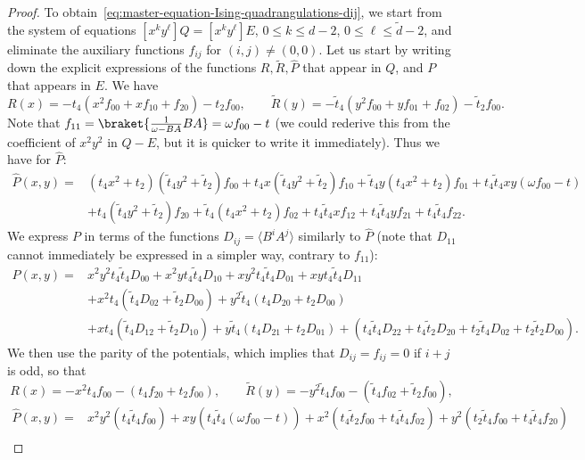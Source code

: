 \documentclass{scrartcl}
\newcommand\brak[1]{\big \langle #1 \big\rangle}
\newcommand\wt[1]{\widetilde{#1}}
\newcommand\wh[1]{\widehat{#1}}
\begin{document}
\begin{proof}
To obtain~\eqref{eq:master-equation-Ising-quadrangulations-dij}, we start from the system of equations $[x^ky^\ell]Q=[x^ky^\ell]E$, $0 \leq k \leq d-2$, $0 \leq \ell \leq \wt d -2$, and eliminate the auxiliary functions $f_{ij}$ for $(i,j)\neq(0,0)$. Let us start by writing down the explicit expressions of the functions $R, \wt{R}, \wh{P}$ that appear in $Q$, and $P$ that appears in $E$. We have
\[
R(x) = -t_4(x^2f_{00} +xf_{10}+f_{20}) - t_2f_{00}, \qquad \widetilde{R}(y) =- \widetilde{t}_4(y^2f_{00} +yf_{01}+f_{02}) - \widetilde{t}_2f_{00}.
\]
Note that $f_{11}=\braket{\frac{1}{\omega - BA}BA}=\omega f_{00}-t$ (we could rederive this from the coefficient of $x^2y^2$ in $Q-E$, but it is quicker to write it immediately). Thus we have for $\wh{P}$:
\begin{align*}
\widehat{P}(x,y) =& (t_4x^2+t_2)(\widetilde{t}_4y^2+\widetilde{t}_2)f_{00} +t_4x(\widetilde{t}_4y^2+\widetilde{t}_2)f_{10} +\widetilde{t}_4y(t_4x^2+t_2)f_{01} +t_4\widetilde{t}_4xy(\omega f_{00} - t) \\
&+t_4(\widetilde{t}_4y^2+\widetilde{t}_2)f_{20} +\widetilde{t}_4(t_4x^2+t_2)f_{02} +t_4\widetilde{t}_4xf_{12} +t_4\widetilde{t}_4yf_{21} +t_4\widetilde{t}_4f_{22}.
\end{align*}
We express $P$ in terms of the functions $D_{ij}=\brak{B^iA^j}$ similarly to $\widehat{P}$ (note that $D_{11}$ cannot immediately be expressed in a simpler way, contrary to $f_{11}$):
\begin{align*}
P(x,y) =& x^2y^2t_4\widetilde{t}_4D_{00} +x^2yt_4\widetilde{t}_4D_{10} +xy^2t_4\widetilde{t}_4D_{01} +xyt_4\widetilde{t}_4D_{11}\\
& +x^2t_4(\widetilde{t}_4D_{02}+\widetilde{t}_2D_{00}) +y^2\widetilde{t}_4(t_4D_{20}+t_2D_{00}) \\
&+xt_4(\widetilde{t}_4D_{12}+\widetilde{t}_2D_{10}) +y\widetilde{t}_4(t_4D_{21}+t_2D_{01}) +(t_4\widetilde{t}_4D_{22}+t_4\widetilde{t}_2D_{20}+t_2\widetilde{t}_4D_{02}+t_2\widetilde{t}_2D_{00}).
\end{align*}
We then use the parity of the potentials, which implies that $D_{ij} = f_{ij} = 0$ if $i+j$ is odd, so that
\[
R(x) = -x^2t_4f_{00} -(t_4f_{20} + t_2f_{00}), \qquad \widetilde{R}(y) =- y^2\widetilde{t}_4f_{00} -(\widetilde{t}_4f_{02} + \widetilde{t}_2f_{00}),
\]
\begin{align*}
\widehat{P}(x,y) =& x^2y^2(t_4\widetilde{t}_4f_{00}) +xy(t_4\widetilde{t}_4(\omega f_{00}-t)) +x^2(t_4\widetilde{t}_2f_{00}+t_4\widetilde{t}_4f_{02}) +y^2(t_2\widetilde{t}_4f_{00}+t_4\widetilde{t}_4f_{20}) \\

\end{align*}
\end{proof}
\end{document}
